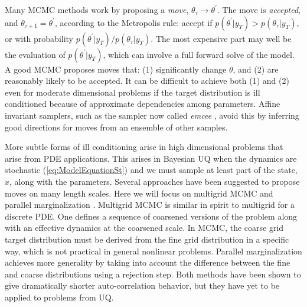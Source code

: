 \documentclass[11pt]{article}
\newcommand{\MarginPar}[1]{\marginpar{%
\vskip-\baselineskip %
\raggedright\tiny\sffamily
\hrule\smallskip{\color{red}#1}\par\smallskip\hrule}}
\begin{document}
Many MCMC methods work by proposing a {\em move}, $\theta_{\tau} \to \theta^{\prime}$.
The move is {\em accepted}, and $\theta_{\tau+1} = \theta^{\prime}$, according to the Metropolis
rule: accept if $p(\theta^{\prime}|y_T) > p(\theta_{\tau}|y_T)$, or with probability
$p(\theta^{\prime}|y_T)/p(\theta_{\tau}|y_T)$.
The most expensive part may well be the evaluation of $p(\theta^{\prime}|y_T)$, which can involve
a full forward solve of the model.
A good MCMC proposes moves that: (1) significantly change $\theta$, and (2) are reasonably likely
to be accepted.
It can be difficult to achieve both (1) and (2) even for moderate dimensional problems if the 
target distribution is ill conditioned because of approximate dependencies among parameters.
Affine invariant samplers, such as the sampler now called {\em emcee} \cite{Foreman-Mackey}, 
avoid this by inferring good directions for moves from an ensemble of other samples.

More subtle forms of ill conditioning arise in high dimensional problems that arise
from PDE applications.
This arises in Bayesian UQ when the dynamics are stochastic (\ref{eq:ModelEquationSt}) and we
must sample at least part of the state, $x$, along with the parameters.
Several approaches have been suggested to propose moves on many length scales.
Here we will focus on multigrid MCMC \cite{Goodman1989}
and parallel marginalization \cite{Weare2007}.
Multigrid MCMC is similar in spirit to multigrid for a discrete PDE.  
One defines a sequence of coarsened versions of the problem along with an effective
dynamics at the coarsened scale.
In MCMC, the coarse grid target distribution must be derived from the fine grid distribution
in a specific way, which is not practical in general nonlinear problems.  
Parallel marginalization achieves more generality by taking into account the difference between
the fine and coarse distributions using a rejection step. 
Both methods have been shown to give dramatically shorter auto-correlation behavior, but they have
yet to be applied to problems from UQ.
\end{document}
